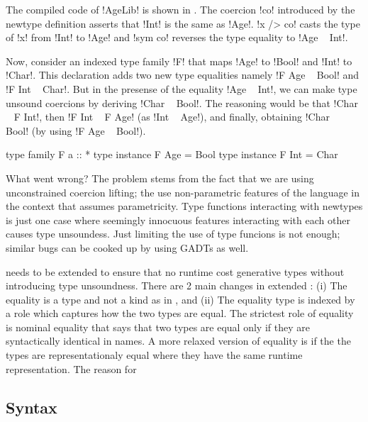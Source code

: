 \documentclass[manuscript,screen,nonacm]{acmart}
\begin{document}
The compiled code of !AgeLib! is shown in . The coercion !co! introduced by the newtype definition asserts that !Int! is the same as !Age!. !x /> co! casts the type of !x! from !Int! to !Age! and !sym co! reverses the type equality to !Age ~ Int!.

Now, consider an indexed type family !F! that maps !Age! to !Bool! and !Int! to !Char!. This declaration adds two new type equalities namely !F Age ~ Bool! and !F Int ~ Char!. But in the presense of the equality !Age ~ Int!, we can make type unsound coercions by deriving !Char ~ Bool!. The reasoning would be that !Char ~ F Int!, then !F Int ~ F Age! (as !Int ~ Age!), and finally, obtaining !Char ~ Bool! (by using !F Age ~ Bool!).

\begin{code}
  type family F a :: *
  type instance F Age = Bool
  type instance F Int = Char
\end{code}

What went wrong? The problem stems from the fact that we are using unconstrained coercion lifting; the use non-parametric features of the language in the context that assumes parametricity. Type functions interacting with newtypes is just one case where seemingly innocuous features interacting with each other causes type unsoundess. Just limiting the use of type funcions is not enough; similar bugs can be cooked up by using GADTs as well.

\SFC needs to be extended to ensure that no runtime cost generative types without introducing type unsoundness.
There are 2 main changes in extended \SFR: (i) The equality is a type and not a kind as in \SFC, and (ii) The equality type is indexed by a role which captures how the two types are equal. The strictest role of equality is nominal equality that says that two types are equal only if they are syntactically identical in names. A more relaxed version of equality is if the the types are representationaly equal where they have the same runtime representation. The reason for 

\subsection{Syntax}



\end{document}
